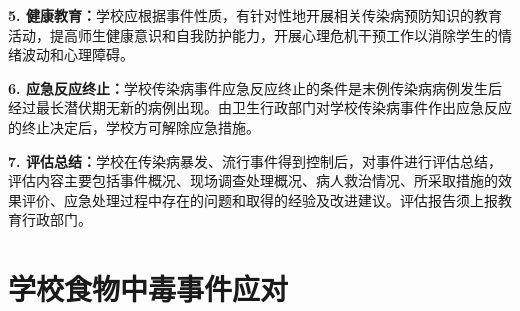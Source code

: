 \begin{keybox}
\textbf{5. 健康教育：}学校应根据事件性质，有针对性地开展相关传染病预防知识的教育活动，提高师生健康意识和自我防护能力，开展心理危机干预工作以消除学生的情绪波动和心理障碍。

\textbf{6. 应急反应终止：}学校传染病事件应急反应终止的条件是末例传染病病例发生后经过最长潜伏期无新的病例出现。由卫生行政部门对学校传染病事件作出应急反应的终止决定后，学校方可解除应急措施。

\textbf{7. 评估总结：}学校在传染病暴发、流行事件得到控制后，对事件进行评估总结，评估内容主要包括事件概况、现场调查处理概况、病人救治情况、所采取措施的效果评价、应急处理过程中存在的问题和取得的经验及改进建议。评估报告须上报教育行政部门。
\end{keybox}

\section{学校食物中毒事件应对}

